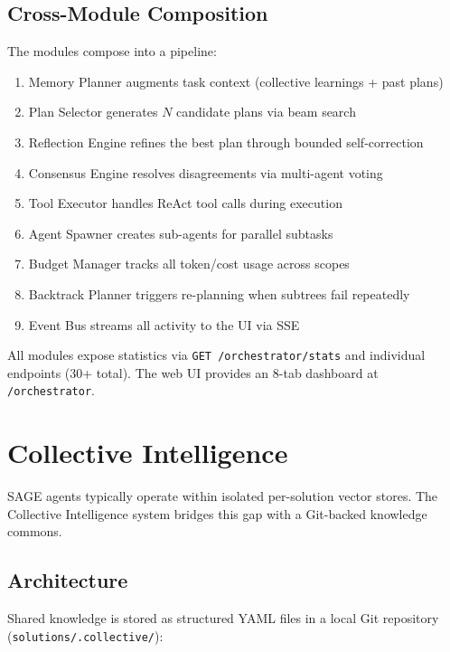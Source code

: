 \documentclass[11pt,a4paper]{article}
\begin{document}
\subsection{Cross-Module Composition}

The modules compose into a pipeline:

\begin{enumerate}[noitemsep]
    \item Memory Planner augments task context (collective learnings + past plans)
    \item Plan Selector generates $N$ candidate plans via beam search
    \item Reflection Engine refines the best plan through bounded self-correction
    \item Consensus Engine resolves disagreements via multi-agent voting
    \item Tool Executor handles ReAct tool calls during execution
    \item Agent Spawner creates sub-agents for parallel subtasks
    \item Budget Manager tracks all token/cost usage across scopes
    \item Backtrack Planner triggers re-planning when subtrees fail repeatedly
    \item Event Bus streams all activity to the UI via SSE
\end{enumerate}

All modules expose statistics via \texttt{GET /orchestrator/stats} and individual endpoints (30+ total). The web UI provides an 8-tab dashboard at \texttt{/orchestrator}.

\section{Collective Intelligence}
\label{sec:collective}

SAGE agents typically operate within isolated per-solution vector stores. The Collective Intelligence system bridges this gap with a Git-backed knowledge commons.

\subsection{Architecture}

Shared knowledge is stored as structured YAML files in a local Git repository (\texttt{solutions/.collective/}):
\end{document}
